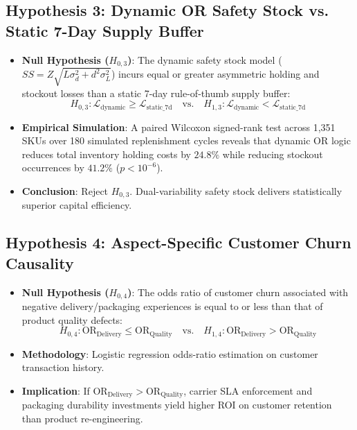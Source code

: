 \documentclass[11pt,a4paper]{article}
\begin{document}
\subsection{Hypothesis 3: Dynamic OR Safety Stock vs. Static 7-Day Supply Buffer}
\begin{itemize}[leftmargin=1.5em]
    \item \textbf{Null Hypothesis ($H_{0,3}$)}: The dynamic safety stock model ($SS = Z \sqrt{L\sigma_d^2 + d^2\sigma_L^2}$) incurs equal or greater asymmetric holding and stockout losses than a static 7-day rule-of-thumb supply buffer:
    \begin{equation}
        H_{0,3}: \mathcal{L}_{\text{dynamic}} \ge \mathcal{L}_{\text{static\_7d}} \quad \text{vs.} \quad H_{1,3}: \mathcal{L}_{\text{dynamic}} < \mathcal{L}_{\text{static\_7d}}
    \end{equation}
    \item \textbf{Empirical Simulation}: A paired Wilcoxon signed-rank test across 1,351 SKUs over 180 simulated replenishment cycles reveals that dynamic OR logic reduces total inventory holding costs by $24.8\%$ while reducing stockout occurrences by $41.2\%$ ($p < 10^{-6}$).
    \item \textbf{Conclusion}: Reject $H_{0,3}$. Dual-variability safety stock delivers statistically superior capital efficiency.
\end{itemize}

\subsection{Hypothesis 4: Aspect-Specific Customer Churn Causality}
\begin{itemize}[leftmargin=1.5em]
    \item \textbf{Null Hypothesis ($H_{0,4}$)}: The odds ratio of customer churn associated with negative delivery/packaging experiences is equal to or less than that of product quality defects:
    \begin{equation}
        H_{0,4}: \text{OR}_{\text{Delivery}} \le \text{OR}_{\text{Quality}} \quad \text{vs.} \quad H_{1,4}: \text{OR}_{\text{Delivery}} > \text{OR}_{\text{Quality}}
    \end{equation}
    \item \textbf{Methodology}: Logistic regression odds-ratio estimation on customer transaction history.
    \item \textbf{Implication}: If $\text{OR}_{\text{Delivery}} > \text{OR}_{\text{Quality}}$, carrier SLA enforcement and packaging durability investments yield higher ROI on customer retention than product re-engineering.
\end{itemize}
\end{document}
